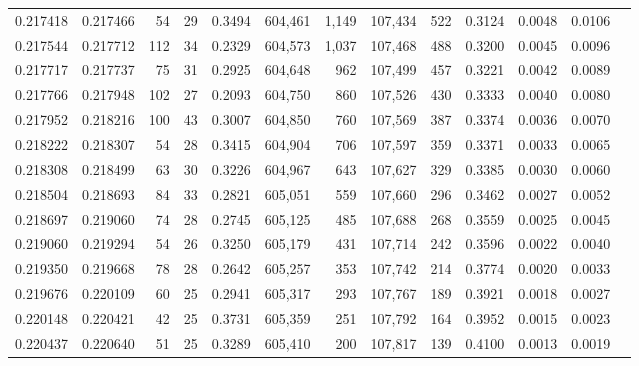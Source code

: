\begin{tabular}{rrrrrrrrrrrrr}
0.217418 & 0.217466 &    54 &  29 &                                     0.3494 & 604,461 &   1,149 & 107,434 &     522 & 0.3124 & 0.0048 & 0.0106 \\
0.217544 & 0.217712 &   112 &  34 &                                     0.2329 & 604,573 &   1,037 & 107,468 &     488 & 0.3200 & 0.0045 & 0.0096 \\
0.217717 & 0.217737 &    75 &  31 &                                     0.2925 & 604,648 &     962 & 107,499 &     457 & 0.3221 & 0.0042 & 0.0089 \\
0.217766 & 0.217948 &   102 &  27 &                                     0.2093 & 604,750 &     860 & 107,526 &     430 & 0.3333 & 0.0040 & 0.0080 \\
0.217952 & 0.218216 &   100 &  43 &                                     0.3007 & 604,850 &     760 & 107,569 &     387 & 0.3374 & 0.0036 & 0.0070 \\
0.218222 & 0.218307 &    54 &  28 &                                     0.3415 & 604,904 &     706 & 107,597 &     359 & 0.3371 & 0.0033 & 0.0065 \\
0.218308 & 0.218499 &    63 &  30 &                                     0.3226 & 604,967 &     643 & 107,627 &     329 & 0.3385 & 0.0030 & 0.0060 \\
0.218504 & 0.218693 &    84 &  33 &                                     0.2821 & 605,051 &     559 & 107,660 &     296 & 0.3462 & 0.0027 & 0.0052 \\
0.218697 & 0.219060 &    74 &  28 &                                     0.2745 & 605,125 &     485 & 107,688 &     268 & 0.3559 & 0.0025 & 0.0045 \\
0.219060 & 0.219294 &    54 &  26 &                                     0.3250 & 605,179 &     431 & 107,714 &     242 & 0.3596 & 0.0022 & 0.0040 \\
0.219350 & 0.219668 &    78 &  28 &                                     0.2642 & 605,257 &     353 & 107,742 &     214 & 0.3774 & 0.0020 & 0.0033 \\
0.219676 & 0.220109 &    60 &  25 &                                     0.2941 & 605,317 &     293 & 107,767 &     189 & 0.3921 & 0.0018 & 0.0027 \\
0.220148 & 0.220421 &    42 &  25 &                                     0.3731 & 605,359 &     251 & 107,792 &     164 & 0.3952 & 0.0015 & 0.0023 \\
0.220437 & 0.220640 &    51 &  25 &                                     0.3289 & 605,410 &     200 & 107,817 &     139 & 0.4100 & 0.0013 & 0.0019 \\

\end{tabular}
